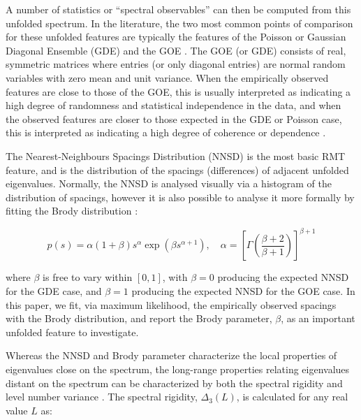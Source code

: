 \documentclass[NETN,manuscript]{stjour-new}
\begin{document}
A number of statistics or ``spectral observables'' \citep{mehtaRandomMatrices2004} can then be
computed from this unfolded spectrum. In the literature, the two most common points of comparison
for these unfolded features are typically the features of the Poisson or Gaussian Diagonal Ensemble
(GDE) and the GOE
\cite[see e.g.][]{santhanamStatisticsAtmosphericCorrelations2001,jalanUncoveringRandomnessSuccess2014,bandyopadhyayUniversalityComplexNetworks2007,agrawalQuantifyingRandomnessProtein2014,raiRandomnessPreservedPatterns2015,
sebaRandomMatrixAnalysis2003,wangSpectralPropertiesTemporal2015,wangRandomMatrixTheory2016}. The
GOE (or GDE) consists of real, symmetric matrices where entries (or only diagonal entries) are
normal random variables with zero mean and unit variance. When the empirically observed features are
close to those of the GOE, this is usually interpreted as indicating a high degree of randomness and
statistical independence in the data, and when the observed features are closer to those expected in
the GDE or Poisson case, this is interpreted as indicating a high degree of coherence or dependence
\citep{santhanamStatisticsAtmosphericCorrelations2001,jalanUncoveringRandomnessSuccess2014,bandyopadhyayUniversalityComplexNetworks2007,agrawalQuantifyingRandomnessProtein2014,raiRandomnessPreservedPatterns2015,
sebaRandomMatrixAnalysis2003,wangSpectralPropertiesTemporal2015,wangRandomMatrixTheory2016,matharooSpontaneousBackpainAlters2020}.

The Nearest-Neighbours Spacings Distribution (NNSD) is the most basic RMT feature, and is the
distribution of the spacings (differences) of adjacent unfolded eigenvalues. Normally, the NNSD is
analysed visually via a histogram of the distribution of spacings, however it is also possible to
analyse it more formally by fitting the Brody distribution \citep{brodyStatisticalMeasureRepulsion1973}:

\[
p(s) = \alpha (1 + \beta) s^\alpha \exp({\beta s^{\alpha+1}}),
\quad \alpha = \left[ \Gamma \left( \frac{\beta+2}{\beta+1} \right) \right]^{\beta+1}
\]

where \(\beta\) is free to vary within \([0, 1]\), with \(\beta = 0\)  producing the expected NNSD
for the GDE case, and \(\beta = 1\) producing the expected NNSD for the GOE case. In this paper, we
fit, via maximum likelihood, the empirically observed spacings with the Brody distribution, and
report the Brody parameter, \(\beta\), as an important unfolded feature to investigate.

Whereas the NNSD and Brody parameter characterize the local properties of eigenvalues close on the
spectrum, the long-range properties relating eigenvalues distant on the spectrum can be
characterized by both the spectral rigidity and level number variance
\citep{guhrRandommatrixTheoriesQuantum1998a,mehtaRandomMatrices2004}. The spectral rigidity,
\(\Delta_3(L)\), is calculated for any real value \(L\) as:
\end{document}
